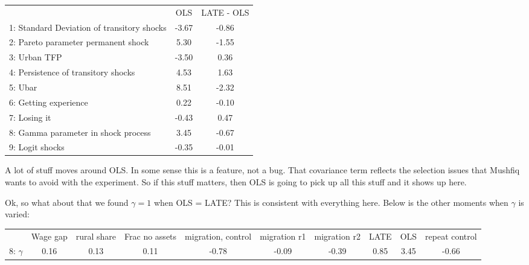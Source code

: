 \documentclass[pdftex,11pt]{article}
\renewcommand{\arraystretch}{.7}
\begin{document}
\begin{table}[!h]
\footnotesize
\setlength {\tabcolsep}{1.5mm}
\renewcommand{\arraystretch}{2.25}
\begin{center}\label{tb:ols-LATE}
\begin{tabular}{l c c}
\hline
\hline
& OLS & LATE - OLS \\
1: Standard Deviation of transitory shocks &   -3.67   &-0.86     \\
2: Pareto parameter permanent shock &           5.30   &-1.55     \\
3: Urban TFP &                                 -3.50   & 0.36     \\
4: Persistence of transitory shocks &            4.53  & 1.63     \\
5: Ubar &                                       8.51   &-2.32     \\
6: Getting experience &                          0.22  &-0.10     \\
7: Losing it &                                -0.43    & 0.47     \\
8: Gamma parameter in shock process &           3.45   &-0.67     \\
9: Logit shocks &                              -0.35   &-0.01     \\
\hline
\hline
\end{tabular}
\end{center}
\end{table}

A lot of stuff moves around OLS. In some sense this is a feature, not a bug. That covariance term reflects the selection issues that Mushfiq wants to avoid with the experiment. So if this stuff matters, then OLS is going to pick up all this stuff and it shows up here.

Ok, so what about that we found $\gamma = 1$ when OLS = LATE? This is consistent with everything here. Below is the other moments when $\gamma$ is varied:
\begin{table}[!h]
\footnotesize
\setlength {\tabcolsep}{1.5mm}
\renewcommand{\arraystretch}{2.25}
\begin{center}\label{tb:employment}
\begin{tabular}{l c c c c c c c c c }
\hline
\hline
           & Wage gap & rural share &  Frac no assets & migration, control &  migration r1 & migration r2 & LATE & OLS &  repeat control \\
8: $\gamma$  &  0.16  &  0.13   & 0.11  & -0.78  & -0.09 &  -0.39   & 0.85  &  3.45 & -0.66  \\

\hline
\hline
\end{tabular}
\end{center}
\end{table}
\end{document}
